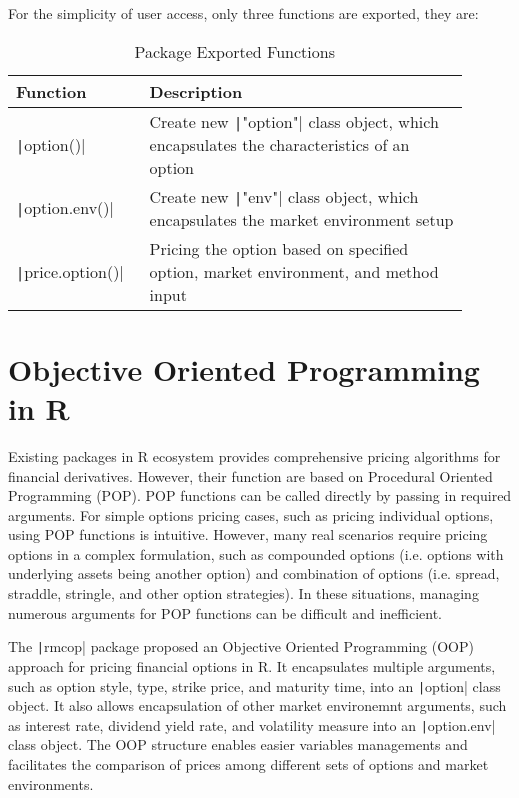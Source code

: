 For the simplicity of user access, only three functions are exported, they are:

\begin{table}[ht] \label{tab:pkg_functions}
\begin{tabular}{p{0.25\linewidth} | p{0.65\linewidth}}
Function                            & Description \\ \hline
\texttt|option()|            & Create new \texttt|"option"| class object, which encapsulates the characteristics of an option \\
\texttt|option.env()|        & Create new \texttt|"env"| class object, which encapsulates the market environment setup \\
\texttt|price.option()|      & Pricing the option based on specified option, market environment, and method input                       
\end{tabular}
\caption{Package Exported Functions}
\end{table}

\section{Objective Oriented Programming in R}

Existing packages in R ecosystem provides comprehensive pricing algorithms for financial derivatives. However, their function are based on Procedural Oriented Programming (POP). POP functions can be called directly by passing in required arguments. For simple options pricing cases, such as pricing individual options, using POP functions is intuitive. However, many real scenarios require pricing options in a complex formulation, such as compounded options (i.e. options with underlying assets being another option) and combination of options (i.e. spread, straddle, stringle, and other option strategies). In these situations, managing numerous arguments for POP functions can be difficult and inefficient.

The \texttt|rmcop| package proposed an Objective Oriented Programming (OOP) approach for pricing financial options in R. It encapsulates multiple arguments, such as option style, type, strike price, and maturity time, into an \texttt|option| class object. It also allows encapsulation of other market environemnt arguments, such as interest rate, dividend yield rate, and volatility measure into an \texttt|option.env| class object. The OOP structure enables easier variables managements and facilitates the comparison of prices among different sets of options and market environments.

